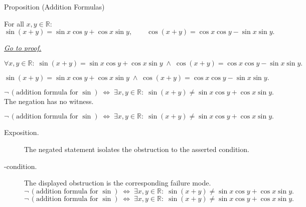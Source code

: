 
\begin{propositionbox}{Proposition (Addition Formulas)}
\begin{proposition}
\label{prop:trig-addition-formulas}
For all $x, y \in \mathbb{R}$:
\[
  \sin(x+y) = \sin x \cos y + \cos x \sin y,
  \qquad
  \cos(x+y) = \cos x \cos y - \sin x \sin y.
\]

\smallskip\noindent


\hyperref[prf:trig-addition-formulas]{\textit{Go to proof.}}
\end{proposition}
\end{propositionbox}

\begin{remark*}
\[
  \forall x,y\in\mathbb{R}:\;
  \sin(x+y) = \sin x\cos y + \cos x\sin y
  \;\wedge\;
  \cos(x+y) = \cos x\cos y - \sin x\sin y.
\]
\end{remark*}

\begin{remark*}
\[
  \sin(x+y) = \sin x\cos y + \cos x\sin y
  \;\wedge\;
  \cos(x+y) = \cos x\cos y - \sin x\sin y.
\]
\end{remark*}

\begin{remark*}
\[
  \neg\,(\text{addition formula for }\sin)
  \;\iff\;
  \exists x,y\in\mathbb{R}:\;
  \sin(x+y) \neq \sin x\cos y + \cos x\sin y.
\]
The negation has no witness.
\end{remark*}

\begin{remark*}
\[
\neg\,(\text{addition formula for }\sin)
  \;\iff\;
  \exists x,y\in\mathbb{R}:\;
  \sin(x+y) \neq \sin x\cos y + \cos x\sin y.
\]
\end{remark*}

\begin{remark*}
\begin{description}
  \item[Exposition.]
  The negated statement isolates the obstruction to the asserted condition.

  \item[\neq-condition.]
  The displayed obstruction is the corresponding failure mode.
  \[
\neg\,(\text{addition formula for }\sin)
  \;\iff\;
  \exists x,y\in\mathbb{R}:\;
  \sin(x+y) \neq \sin x\cos y + \cos x\sin y.
  \]
  \[
\neg\,(\text{addition formula for }\sin)
  \;\iff\;
  \exists x,y\in\mathbb{R}:\;
  \sin(x+y) \neq \sin x\cos y + \cos x\sin y.
  \]
\end{description}
\end{remark*}



